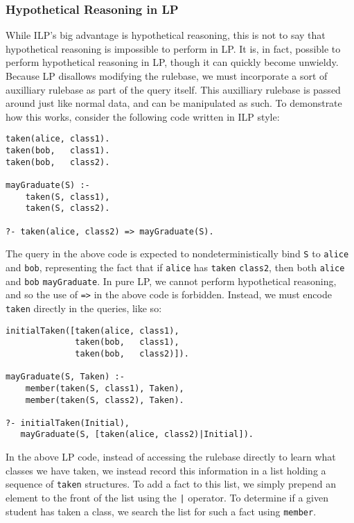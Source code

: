 \subsubsection{Hypothetical Reasoning in LP}
While ILP's big advantage is hypothetical reasoning, this is not to say that hypothetical reasoning is impossible to perform in LP.
It is, in fact, possible to perform hypothetical reasoning in LP, though it can quickly become unwieldy.
Because LP disallows modifying the rulebase, we must incorporate a sort of auxilliary rulebase as part of the query itself.
This auxilliary rulebase is passed around just like normal data, and can be manipulated as such.
To demonstrate how this works, consider the following code written in ILP style:

\begin{verbatim}
taken(alice, class1).
taken(bob,   class1).
taken(bob,   class2).

mayGraduate(S) :-
    taken(S, class1),
    taken(S, class2).

?- taken(alice, class2) => mayGraduate(S).
\end{verbatim}

The query in the above code is expected to nondeterministically bind \texttt{S} to \texttt{alice} and \texttt{bob}, representing the fact that if \texttt{alice} has \texttt{taken} \texttt{class2}, then both \texttt{alice} and \texttt{bob} \texttt{mayGraduate}.
In pure LP, we cannot perform hypothetical reasoning, and so the use of \texttt{=>} in the above code is forbidden.
Instead, we must encode \texttt{taken} directly in the queries, like so:

\begin{verbatim}
initialTaken([taken(alice, class1),
              taken(bob,   class1),
              taken(bob,   class2)]).

mayGraduate(S, Taken) :-
    member(taken(S, class1), Taken),
    member(taken(S, class2), Taken).

?- initialTaken(Initial),
   mayGraduate(S, [taken(alice, class2)|Initial]).
\end{verbatim}

In the above LP code, instead of accessing the rulebase directly to learn what classes we have taken, we instead record this information in a list holding a sequence of \texttt{taken} structures.
To add a fact to this list, we simply prepend an element to the front of the list using the \texttt{|} operator.
To determine if a given student has taken a class, we search the list for such a fact using \texttt{member}.

